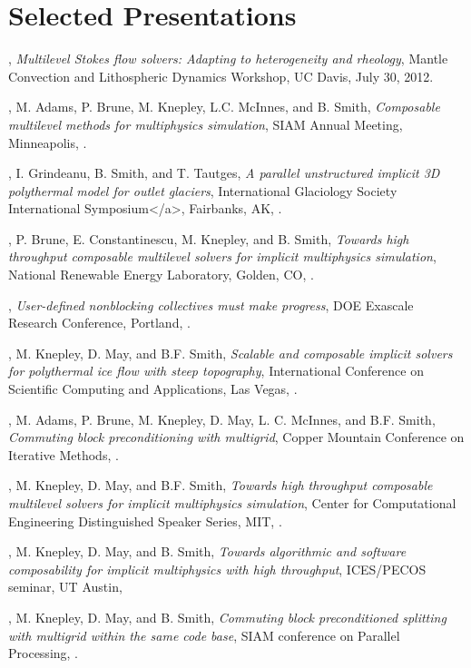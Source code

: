 \documentclass[10pt,letterpaper]{article}
\newcommand\ptitle[1]{\textit{#1}} %
\renewenvironment{itemize}{
  \begin{list}{}{
    \setlength{\leftmargin}{1.5em}
    \setlength{\itemsep}{0.25em}
    \setlength{\parskip}{0pt}
    \setlength{\parsep}{0.25em}
  }
}{
  \end{list}
}
\begin{document}
\section*{Selected Presentations}
\begin{itemize}
\item {\JedBrown}, \ptitle{Multilevel Stokes flow solvers: Adapting to heterogeneity and rheology}, Mantle Convection and Lithospheric Dynamics Workshop, UC Davis, July 30, 2012.
\item {\JedBrown}, M. Adams, P. Brune, M. Knepley, L.C. McInnes, and B. Smith, \ptitle{Composable multilevel methods for multiphysics simulation}, SIAM Annual Meeting, Minneapolis, .
\item {\JedBrown}, I. Grindeanu, B. Smith, and T. Tautges, \ptitle{A parallel unstructured implicit 3D polythermal model for outlet glaciers}, International Glaciology Society International Symposium</a>, Fairbanks, AK, .
\item {\JedBrown}, P. Brune, E. Constantinescu, M. Knepley, and B. Smith, \ptitle{Towards high throughput composable multilevel solvers for implicit multiphysics simulation}, National Renewable Energy Laboratory, Golden, CO, .
\item {\JedBrown}, \ptitle{User-defined nonblocking collectives must make progress}, DOE Exascale Research Conference, Portland, .
\item {\JedBrown}, M. Knepley, D. May, and B.F. Smith, \ptitle{Scalable and composable implicit solvers for polythermal ice flow with steep topography}, International Conference on Scientific Computing and Applications, Las Vegas, .
\item {\JedBrown}, M. Adams, P. Brune, M. Knepley, D. May, L. C. McInnes, and B.F. Smith, \ptitle{Commuting block preconditioning with multigrid}, Copper Mountain Conference on Iterative Methods, .
\item {\JedBrown}, M. Knepley, D. May, and B.F. Smith, \ptitle{Towards high throughput composable multilevel solvers for implicit multiphysics simulation}, Center for Computational Engineering Distinguished Speaker Series, MIT, .
\item {\JedBrown}, M. Knepley, D. May, and B. Smith, \ptitle{Towards algorithmic and software composability for implicit multiphysics with high throughput}, ICES/PECOS seminar, UT Austin, 
\item {\JedBrown}, M. Knepley, D. May, and B. Smith, \ptitle{Commuting block preconditioned splitting with multigrid within the same code base}, SIAM conference on Parallel Processing, .

\end{itemize}
\end{document}

